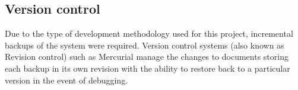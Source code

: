 \documentclass[12pt,a4paper]{article}
\newcommand\tab[1][.7cm]{\hspace*{#1}}
\begin{document}
%
%
	

	\subsection{Version control}
	\tab Due to the type of development methodology used for this project, incremental backups of the system
were required. Version control systems (also known as Revision control) such as Mercurial manage
the changes to documents storing each backup in its own revision with the ability to restore back to a
particular version in the event of debugging.
	
\end{document}

